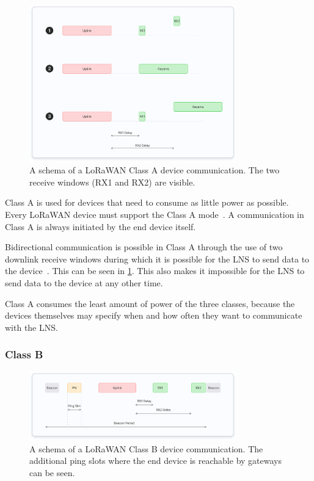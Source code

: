 \begin{figure}[htbp]
    \centering
    \includegraphics[width=0.8\textwidth]{pictures/device-classes/class-a.png}
    \caption{
        A schema of a \ac{LoRaWAN} Class A device communication.
        The two receive windows (RX1 and RX2) are visible.~\protect\cite{the_things_industries_bv_device_nodate}
    }\label{pic:lorawan-device-class-a-schema}
\end{figure}

Class A is used for devices that need to consume as little power as possible.
Every \ac{LoRaWAN} device must support the Class A mode~\cite[p. 11]{lora_alliance_inc_lorawan_specification_2017}.
A communication in Class A is always initiated by the end device itself.

Bidirectional communication is possible in Class A through the use of two downlink receive windows during which it is possible for the \ac{LNS} to send data to the device~\cite[p. 13]{lora_alliance_inc_lorawan_specification_2017}.
This can be seen in \cref{pic:lorawan-device-class-a-schema}.
This also makes it impossible for the \ac{LNS} to send data to the device at any other time.

Class A consumes the least amount of power of the three classes, because the devices themselves may specify when and how often they want to communicate with the \ac{LNS}.

\subsubsection{Class B}

\begin{figure}[htbp]
    \centering
    \includegraphics[width=0.8\textwidth]{pictures/device-classes/class-b.png}
    \caption{
        A schema of a \ac{LoRaWAN} Class B device communication.
        The additional ping slots where the end device is reachable by gateways can be seen.~\protect\cite{the_things_industries_bv_device_nodate}
    }\label{pic:lorawan-device-class-b-schema}
\end{figure}

